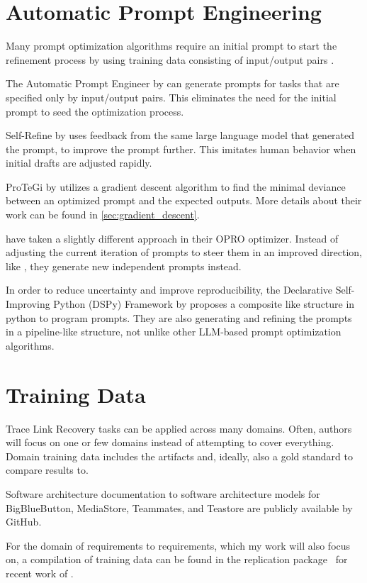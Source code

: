 \section{Automatic Prompt Engineering}
\label{related:sec:ape}
Many prompt optimization algorithms require an initial prompt to start the refinement process by using training data consisting of input/output pairs \cite{ramnath2025SystematicSurvey}.

The Automatic Prompt Engineer by  can generate prompts for tasks that are specified only by input/output pairs. This eliminates the need for the initial prompt to seed the optimization process.

Self-Refine by  uses feedback from the same large language model that generated the prompt, to improve the prompt further. This imitates human behavior when initial drafts are adjusted rapidly. 

ProTeGi by  utilizes a gradient descent algorithm to find the minimal deviance between an optimized prompt and the expected outputs. More details about their work can be found in \ref{sec:gradient_descent}.

 have taken a slightly different approach in their OPRO optimizer. Instead of adjusting the current iteration of prompts to steer them in an improved direction, like \citeauthor{pryzant2023AutomaticPrompt}, they generate new independent prompts instead.

In order to reduce uncertainty and improve reproducibility, the Declarative Self-Improving Python (DSPy) Framework by  proposes a composite like structure in python to program prompts. They are also generating and refining the prompts in a pipeline-like structure, not unlike other LLM-based prompt optimization algorithms. 

\section{Training Data}
Trace Link Recovery tasks can be applied across many domains. Often, authors will focus on one or few domains instead of attempting to cover everything. Domain training data includes the artifacts and, ideally, also a gold standard to compare results to.

Software architecture documentation to software architecture models for BigBlueButton, MediaStore, Teammates, and Teastore are publicly available by  GitHub.

For the domain of requirements to requirements, which my work will also focus on, a compilation of training data can be found in the replication package~\cite{hey2025ReplicationPackage} for recent work of \citeauthor{hey2025RequirementsTraceability}.